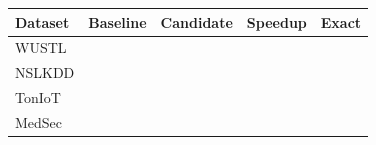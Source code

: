 \begin{tabular}{lrrrr}
\toprule
Dataset & Baseline & Candidate & Speedup & Exact \\
\midrule
WUSTL &  &  &  &  \\
NSLKDD &  &  &  &  \\
TonIoT &  &  &  &  \\
MedSec &  &  &  &  \\
\bottomrule
\end{tabular}
